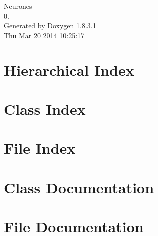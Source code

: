 \documentclass{book}
\begin{document}
\hypersetup{pageanchor=false,citecolor=blue}
\begin{titlepage}
\vspace*{7cm}
\begin{center}
{\Large Neurones \\[1ex]\large 0. }\\
\vspace*{1cm}
{\large Generated by Doxygen 1.8.3.1}\\
\vspace*{0.5cm}
{\small Thu Mar 20 2014 10:25:17}\\
\end{center}
\end{titlepage}
\clearemptydoublepage
{}
\tableofcontents
\clearemptydoublepage
{}
\hypersetup{pageanchor=true,citecolor=blue}
\chapter{Hierarchical Index}

\chapter{Class Index}

\chapter{File Index}

\chapter{Class Documentation}














\chapter{File Documentation}
























\printindex
\end{document}
